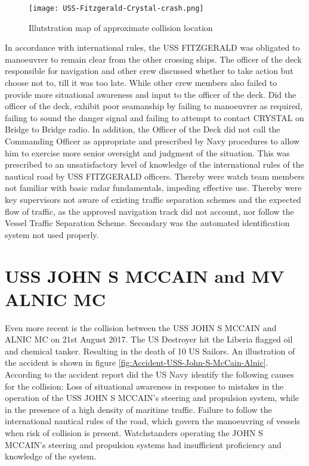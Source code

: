 \begin{figure}[H]
	\centering
	\texttt{[image: USS-Fitzgerald-Crystal-crash.png]}
	\caption{Illutstration map of approximate collision location}
	\label{fig:Accident-USS-Fitzgerald-Crystal}
\end{figure}

In accordance with international rules, the USS FITZGERALD was obligated to manoeuvrer to remain clear from the other crossing ships. The officer of the deck responsible for navigation and other crew discussed whether to take action but choose not to, till it was too late. While other crew members also failed to provide more situational awareness and input to the officer of the deck. Did the officer of the deck, exhibit poor seamanship by failing to manoeuvrer as required, failing to sound the danger signal and failing to attempt to contact CRYSTAL on Bridge to Bridge radio. In addition, the Officer of the Deck did not call the Commanding Officer as appropriate and prescribed by Navy procedures to allow him to exercise more senior oversight and judgment of the situation. This was prescribed to an unsatisfactory level of knowledge of the international rules of the nautical road by USS FITZGERALD officers. Thereby were watch team members not familiar with basic radar fundamentals, impeding effective use. Thereby were key supervisors not aware of existing traffic separation schemes and the expected flow of traffic, as the approved navigation track did not account, nor follow the Vessel Traffic Separation Scheme. Secondary was the automated identification system not used properly. \cite{USNavy2017}

\newpage
\section{USS JOHN S MCCAIN and MV ALNIC MC}
Even more recent is the collision between the USS JOHN S MCCAIN and ALNIC MC on 21st August 2017. The US Destroyer hit the Liberia flagged oil and chemical tanker. Resulting in the death of 10  US Sailors. An illustration of the accident is shown in figure \ref{fig:Accident-USS-John-S-McCain-Alnic}. According to the accident report did the US Navy identify the following causes for the collision: Loss of situational awareness in response to mistakes in the operation of the USS JOHN S MCCAIN's steering and propulsion system, while in the presence of a high density of maritime traffic. Failure to follow the international nautical rules of the road, which govern the manoeuvring of vessels when risk of collision is present. Watchstanders operating the JOHN S MCCAIN's steering and propulsion systems had insufficient proficiency and knowledge of the system. 

